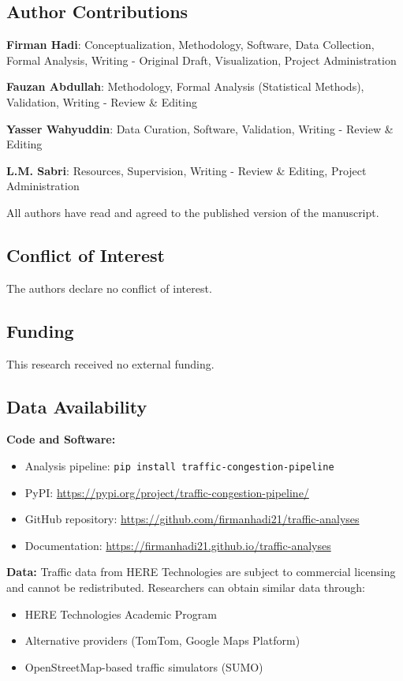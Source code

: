 \documentclass[11pt,a4paper]{article}
\begin{document}
\subsection*{Author Contributions}

\textbf{Firman Hadi}: Conceptualization, Methodology, Software, Data Collection, Formal Analysis, Writing - Original Draft, Visualization, Project Administration

\textbf{Fauzan Abdullah}: Methodology, Formal Analysis (Statistical Methods), Validation, Writing - Review \& Editing

\textbf{Yasser Wahyuddin}: Data Curation, Software, Validation, Writing - Review \& Editing

\textbf{L.M. Sabri}: Resources, Supervision, Writing - Review \& Editing, Project Administration

All authors have read and agreed to the published version of the manuscript.

\subsection*{Conflict of Interest}

The authors declare no conflict of interest.

\subsection*{Funding}

This research received no external funding.

\subsection*{Data Availability}

\textbf{Code and Software:}
\begin{itemize}
    \item Analysis pipeline: \texttt{pip install traffic-congestion-pipeline}
    \item PyPI: \url{https://pypi.org/project/traffic-congestion-pipeline/}
    \item GitHub repository: \url{https://github.com/firmanhadi21/traffic-analyses}
    \item Documentation: \url{https://firmanhadi21.github.io/traffic-analyses}
\end{itemize}

\textbf{Data:}
Traffic data from HERE Technologies are subject to commercial licensing and cannot be redistributed. Researchers can obtain similar data through:
\begin{itemize}
    \item HERE Technologies Academic Program
    \item Alternative providers (TomTom, Google Maps Platform)
    \item OpenStreetMap-based traffic simulators (SUMO)
\end{itemize}
\end{document}

